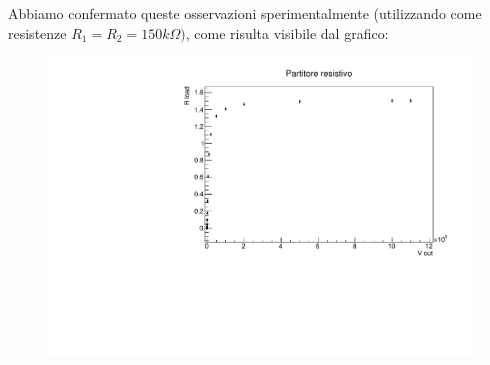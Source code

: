 Abbiamo confermato queste osservazioni sperimentalmente (utilizzando come resistenze $R_{1} = R_{2} = 150k\Omega)$, come risulta visibile dal grafico:

\begin{figure}[H]
    \centering
    \includegraphics[scale=.6]{partitore resistivo.pdf}
    \caption{}
    \label{fig: partitore resistivo}
\end{figure}